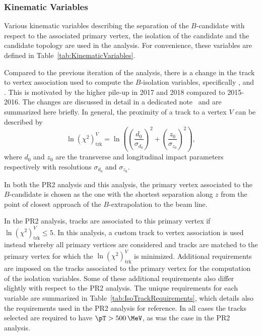 \subsubsection{Kinematic Variables}
\label{subsec:KinematicVariables}
Various kinematic variables describing the separation of the $B$-candidate with respect to the associated primary vertex, the isolation of the candidate and the candidate topology are used in the analysis.
For convenience, these variables are defined in Table~\ref{tab:KinematicVariables}.


Compared to the previous iteration of the analysis, there is a change in the track to vertex association used to compute the $B$-isolation variables, specifically \biso, \docaxtrk and \nclosetrk.
This is motivated by the higher pile-up in 2017 and 2018 compared to 2015-2016. 
The changes are discussed in detail in a dedicated note~\cite{Grummer:2766854} and are summarized here briefly. 
In general, the proximity of a track to a vertex $V$ can be described by 
\begin{equation}
  \ln(\chi^2)_{\text{trk}}^{V} = \ln\left(\left(\frac{d_0}{\sigma_{d_0}}\right)^2 
    + \left(\frac{z_0}{\sigma_{z_0}}\right)^2\right),
\end{equation}
where $d_0$ and $z_0$ are the transverse and longitudinal impact parameters respectively with resolutions $\sigma_{d_0}$ and $\sigma_{z_0}$.

In both the PR2 analysis and this analysis, the primary vertex associated to the $B$-candidate is chosen as the one with the shortest separation along $z$ from the point of closest approach of the $B$-extrapolation to the beam line. 

In the PR2 analysis, tracks are associated to this primary vertex if $\ln(\chi^2)_{\text{trk}}^{V} \leq 5$. 
In this analysis, a custom track to vertex association is used instead whereby all primary vertices are considered and tracks are matched to the primary vertex for which the $\ln(\chi^2)_{\text{trk}}^{V}$ is minimized. 
Additional requirements are imposed on the tracks associated to the primary vertex for the computation of the isolation variables.
Some of these additional requirements also differ slightly with respect to the PR2 analysis.   
The unique requirements for each variable are summarized in Table~\ref{tab:IsoTrackRequirements}, which details also the requirements used in the PR2 analysis for reference. 
In all cases the tracks selected are required to have $\pT > 500\,\MeV$, as was the case in the PR2 analysis. 

